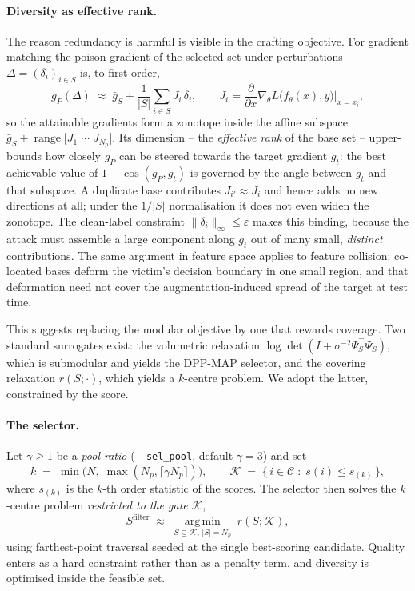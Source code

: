 \paragraph{Diversity as effective rank.}
The reason redundancy is harmful is visible in the crafting objective.  For
gradient matching the poison gradient of the selected set under perturbations
$\Delta=(\delta_i)_{i\in S}$ is, to first order,
\begin{equation}
  g_P(\Delta)\;\approx\;\bar{g}_S+\frac{1}{|S|}\sum_{i\in S}J_i\,\delta_i,
  \qquad
  J_i=\frac{\partial}{\partial x}\nabla_\theta
        L\bigl(f_\theta(x),y\bigr)\Big|_{x=x_i},
  \label{eq:linearise}
\end{equation}
so the attainable gradients form a zonotope inside the affine subspace
$\bar{g}_S+\operatorname{range}\bigl[J_1\;\cdots\;J_{N_p}\bigr]$.  Its
dimension -- the \emph{effective rank} of the base set -- upper-bounds how
closely $g_P$ can be steered towards the target gradient $g_t$: the best
achievable value of $1-\cos(g_P,g_t)$ is governed by the angle between $g_t$
and that subspace.  A duplicate base contributes $J_{i'}\approx J_i$ and hence
adds no new directions at all; under the $1/|S|$ normalisation it does not
even widen the zonotope.  The clean-label constraint
$\lVert\delta_i\rVert_\infty\le\varepsilon$ makes this binding, because the
attack must assemble a large component along $g_t$ out of many small,
\emph{distinct} contributions.  The same argument in feature space applies to
feature collision: co-located bases deform the victim's decision boundary in
one small region, and that deformation need not cover the augmentation-induced
spread of the target at test time.

This suggests replacing the modular objective by one that rewards coverage.
Two standard surrogates exist: the volumetric relaxation
$\log\det(I+\sigma^{-2}\Psi_S^{\top}\Psi_S)$, which is submodular and yields
the DPP-MAP selector, and the covering relaxation $r(S;\cdot)$, which yields a
$k$-centre problem.  We adopt the latter, constrained by the score.

\paragraph{The selector.}
Let $\gamma\ge1$ be a \emph{pool ratio} (\texttt{-{}-sel\_pool}, default
$\gamma=3$) and set
\begin{equation}
  k \;=\; \min\bigl(N,\;\max(N_p,\lceil\gamma N_p\rceil)\bigr),
  \qquad
  \mathcal{K} \;=\; \bigl\{\,i\in\mathcal{C}\;:\;s(i)\le s_{(k)}\,\bigr\},
  \label{eq:gate}
\end{equation}
where $s_{(k)}$ is the $k$-th order statistic of the scores.  The selector
then solves the $k$-centre problem \emph{restricted to the gate}
$\mathcal{K}$,
\begin{equation}
  S^{\mathrm{filter}}
  \;\approx\;\operatorname*{arg\,min}_{S\subseteq\mathcal{K},\,|S|=N_p}
      \; r(S;\mathcal{K}),
  \label{eq:kcenter}
\end{equation}
using farthest-point traversal seeded at the single best-scoring candidate.
Quality enters as a hard constraint rather than as a penalty term, and
diversity is optimised inside the feasible set.

